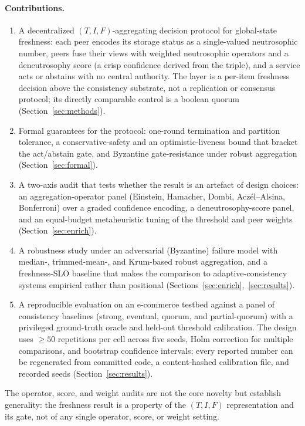 \documentclass[fleqn,10pt]{wlscirep}
\begin{document}
\paragraph{Contributions.}
\begin{enumerate}
\item A decentralized $(T,I,F)$-aggregating decision protocol for global-state freshness: each peer
encodes its storage status as a single-valued neutrosophic number, peers fuse their views with
weighted neutrosophic operators and a deneutrosophy score (a crisp confidence derived from the triple),
and a service acts or abstains with no central authority. The layer is a per-item freshness decision
above the consistency substrate, not a replication or consensus protocol; its directly comparable
control is a boolean quorum (Section~\ref{sec:methods}).
\item Formal guarantees for the protocol: one-round termination and partition tolerance, a
conservative-safety and an optimistic-liveness bound that bracket the act/abstain gate, and Byzantine
gate-resistance under robust aggregation (Section~\ref{sec:formal}).
\item A two-axis audit that tests whether the result is an artefact of design choices: an
aggregation-operator panel (Einstein, Hamacher, Dombi, Acz\'el--Alsina, Bonferroni) over a graded
confidence encoding, a deneutrosophy-score panel, and an equal-budget metaheuristic tuning of the
threshold and peer weights (Section~\ref{sec:enrich}).
\item A robustness study under an adversarial (Byzantine) failure model with median-, trimmed-mean-,
and Krum-based robust aggregation, and a freshness-SLO baseline that makes the comparison to
adaptive-consistency systems empirical rather than positional (Sections~\ref{sec:enrich},~\ref{sec:results}).
\item A reproducible evaluation on an e-commerce testbed against a panel of consistency baselines
(strong, eventual, quorum, and partial-quorum) with a privileged ground-truth oracle and held-out
threshold calibration. The design uses $\geq 50$ repetitions per cell across five seeds, Holm correction
for multiple comparisons, and bootstrap confidence intervals; every reported number can be regenerated
from committed code, a content-hashed calibration file, and recorded seeds (Section~\ref{sec:results}).
\end{enumerate}

The operator, score, and weight audits are not the core novelty but establish generality: the freshness
result is a property of the $(T,I,F)$ representation and its gate, not of any single operator, score, or
weight setting.
\end{document}
